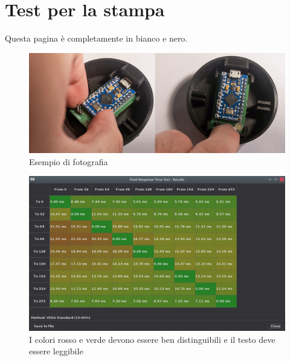 \documentclass[12pt]{report}
\begin{document}
	\sloppy
	\setlength{\parskip}{10pt}
	\setlength{\parindent}{0pt}
	
	\chapter{Test per la stampa}
	Questa pagina è completamente in bianco e nero.

	\lipsum[1-4]
	\begin{figure}[H]
		\centering
		\includegraphics[width=\textwidth]{Dispositivo_files/assembly_14.jpg}
		\caption{Esempio di fotografia}
		\label{fig:photo1}
	\end{figure}
	\begin{figure}[H]
		\centering
		\includegraphics[width=\textwidth]{Applicazione_files/gui_pixelresponse_results.png}
		\caption{I colori rosso e verde devono essere ben distinguibili e il testo deve essere leggibile}
		\label{fig:screen1}
	\end{figure}
\end{document}
